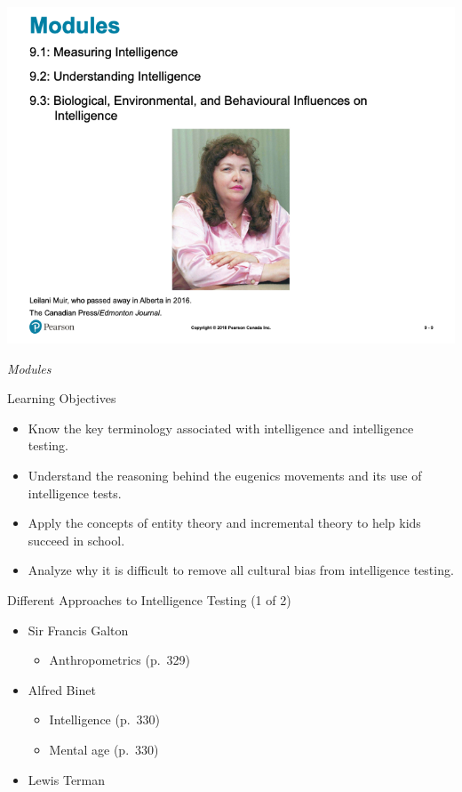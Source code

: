 \documentclass[
]{book}
\providecommand{\tightlist}{%
  \setlength{\itemsep}{0pt}\setlength{\parskip}{0pt}}
\begin{document}
\begin{reflect}
\includegraphics{assets/unit_2/slide_9.png}

\emph{Modules}

Learning Objectives

\begin{itemize}
\tightlist
\item
  Know the key terminology associated with intelligence and intelligence testing.\\
\item
  Understand the reasoning behind the eugenics movements and its use of intelligence tests.\\
\item
  Apply the concepts of entity theory and incremental theory to help kids succeed in school.\\
\item
  Analyze why it is difficult to remove all cultural bias from intelligence testing.
\end{itemize}

Different Approaches to Intelligence Testing (1 of 2)

\begin{itemize}
\tightlist
\item
  Sir Francis Galton

  \begin{itemize}
  \tightlist
  \item
    Anthropometrics (p.~329)\\
  \end{itemize}
\item
  Alfred Binet

  \begin{itemize}
  \tightlist
  \item
    Intelligence (p.~330)\\
  \item
    Mental age (p.~330)\\
  \end{itemize}
\item
  Lewis Terman


\end{itemize}
\end{reflect}
\end{document}
